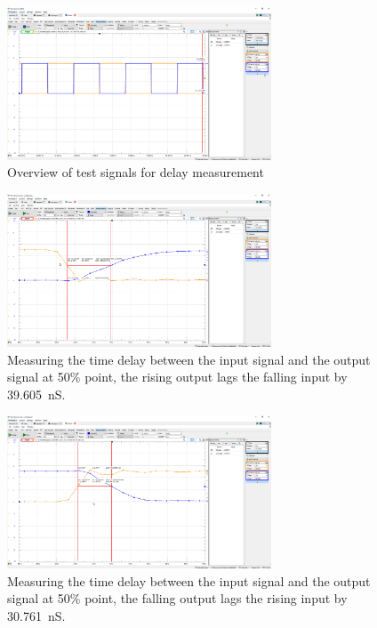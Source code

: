 \documentclass{article}
\begin{document}
	\begin{figure}[H]
	    \centering
	    \includegraphics[width=0.7\textwidth]{2a-1-delay-lab}
	    \caption{Overview of test signals for delay measurement}
	\end{figure}
	
	
	\begin{figure}[H]
	    \centering
	    \includegraphics[width=0.7\textwidth]{2a-3-rising-delay-lab}
	    \caption[Measuring the rising output time delay]{Measuring the time delay between the input signal and the output signal at 50\% point, the rising output lags the falling input by \SI{39.605}{nS}.}
	\end{figure}
	
	\begin{figure}[H]
	    \centering
	    \includegraphics[width=0.7\textwidth]{2a-3-falling-delay-lab}
	    \caption[Measuring the falling output time delay]{Measuring the time delay between the input signal and the output signal at 50\% point, the falling output lags the rising input by \SI{30.761}{nS}.}
	\end{figure}
	
\end{document}
